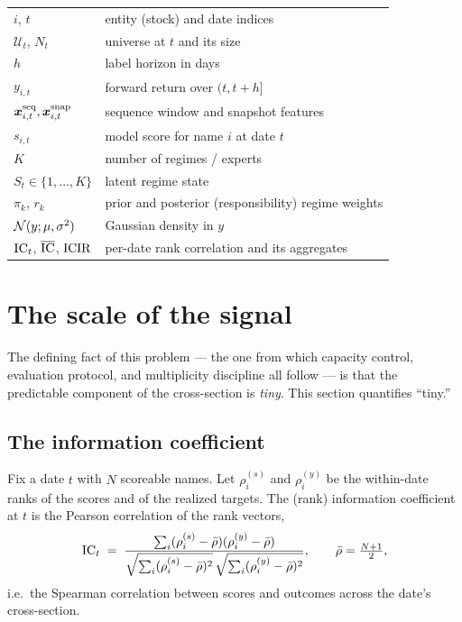 \begin{center}
\small
\begin{tabular}{@{}ll@{}}
\toprule
$i$, $t$ & entity (stock) and date indices \\
$\mathcal{U}_t$, $N_t$ & universe at $t$ and its size \\
$h$ & label horizon in days \\
$y_{i,t}$ & forward return over $(t, t+h]$ \\
$\bm{x}^{\text{seq}}_{i,t}, \bm{x}^{\text{snap}}_{i,t}$ & sequence window and snapshot features \\
$s_{i,t}$ & model score for name $i$ at date $t$ \\
$K$ & number of regimes / experts \\
$S_t \in \{1,\dots,K\}$ & latent regime state \\
$\pi_k$, $r_k$ & prior and posterior (responsibility) regime weights \\
$\mathcal{N}(y;\mu,\sigma^2)$ & Gaussian density in $y$ \\
$\mathrm{IC}_t$, $\overline{\mathrm{IC}}$, $\mathrm{ICIR}$ & per-date rank correlation and its aggregates \\
\bottomrule
\end{tabular}
\end{center}

\section{The scale of the signal}\label{sec:scale}

The defining fact of this problem --- the one from which capacity control,
evaluation protocol, and multiplicity discipline all follow --- is that the
predictable component of the cross-section is \emph{tiny}. This section
quantifies ``tiny.''

\subsection{The information coefficient}

\begin{definition}\label{def:ic}
Fix a date $t$ with $N$ scoreable names. Let $\rho^{(s)}_{i}$ and
$\rho^{(y)}_{i}$ be the within-date ranks of the scores and of the realized
targets. The (rank) information coefficient at $t$ is the Pearson correlation
of the rank vectors,
\[
  \mathrm{IC}_t \;=\;
  \frac{\sum_i (\rho^{(s)}_i - \bar\rho)(\rho^{(y)}_i - \bar\rho)}
       {\sqrt{\sum_i (\rho^{(s)}_i - \bar\rho)^2}\,
        \sqrt{\sum_i (\rho^{(y)}_i - \bar\rho)^2}},
  \qquad \bar\rho = \tfrac{N+1}{2},
\]
i.e.\ the Spearman correlation between scores and outcomes across the date's
cross-section.
\end{definition}

